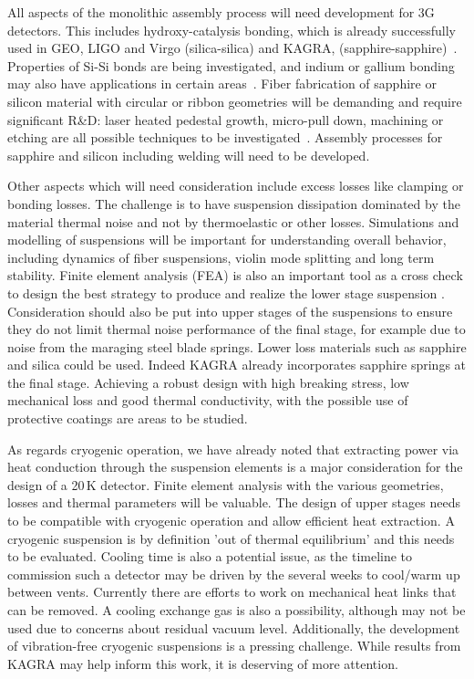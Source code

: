 All aspects of the monolithic assembly process will need development for 3G detectors. This includes hydroxy-catalysis bonding, which is already successfully used in GEO, LIGO and Virgo (silica-silica) and KAGRA, (sapphire-sapphire)~\cite{dari:2010, Amico:2002, vanVeggel:2014, Haughian:2016}. Properties of Si-Si bonds are being investigated, and indium or gallium bonding may also have applications in certain areas~\cite{Hofmann:2015, Murray:2015Low_Temp}.  Fiber fabrication of sapphire or silicon material with circular or ribbon geometries will be demanding and require significant R\&D: laser heated pedestal growth, micro-pull down, machining or etching are all possible techniques to be investigated~\cite{Cumming:2014Silicon, Alshourbagy:2005}. Assembly processes for sapphire and silicon including welding will need to be developed.

Other aspects which will need consideration include excess losses like clamping or bonding losses. The challenge is to have suspension dissipation dominated by the material thermal noise and not by thermoelastic or other losses.
Simulations and modelling of suspensions will be important for understanding overall behavior, including dynamics of fiber suspensions, violin mode splitting and long term stability. Finite element analysis (FEA) is also an important tool as a cross check to design the best strategy to produce and realize the lower stage suspension \cite{Lorenzini:2010, Sorazu2017Sus}.
Consideration should also be put into upper stages of the suspensions to ensure they do not limit thermal noise performance of the final stage, for example due to noise from the maraging steel blade springs. Lower loss materials such as sapphire and silica could be used. Indeed KAGRA already incorporates sapphire springs at the final stage. Achieving a robust design with high breaking stress, low mechanical loss and good thermal conductivity, with the possible use of protective coatings are areas to be studied. 

As regards cryogenic operation, we have already noted that extracting power via heat conduction through the suspension elements is a major consideration for the design of a 20\,K detector. Finite element analysis with the various geometries, losses and thermal parameters will be valuable. The design of upper stages needs to be compatible with cryogenic operation and allow efficient heat extraction. A cryogenic suspension is by definition 'out of thermal equilibrium' and this needs to be evaluated. Cooling time is also a potential issue, as the timeline to commission such a detector may be driven by the several weeks to cool/warm up between vents. Currently there are efforts to work on mechanical heat links that can be removed. A cooling exchange gas is also a possibility, although may not be used due to concerns about residual vacuum level. Additionally, the development of vibration-free cryogenic suspensions is a pressing challenge. While results from KAGRA may help inform this work, it is deserving of more attention.

